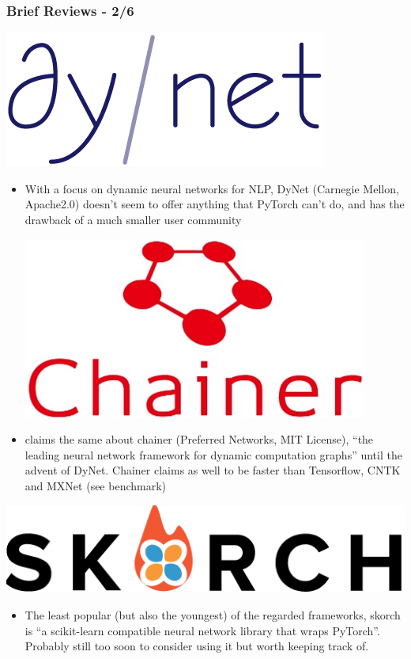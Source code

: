 \documentclass[hyperref={pdfpagelabels=false}]{beamer}
\begin{document}
     \begin{frame}
       \frametitle{Brief Reviews - 2/6}
       \centering
       \includegraphics[scale=0.14]{logo_dynet.png}
       \begin{itemize}[<.->]
       \item \small{With a focus on dynamic neural networks for NLP\cite[p.200]{petuum}, DyNet (Carnegie Mellon, Apache2.0) doesn't seem to offer anything that PyTorch can't do, and has the drawback of a much smaller user community\cite{dl4j-review}}
         
       \centering
       \includegraphics[scale=0.14]{logo_chainer.png}
     \item \small{\cite{dl4j-review} claims the same about chainer (Preferred Networks, MIT License), ``the leading neural network framework for dynamic computation graphs'' until the advent of DyNet}. Chainer claims as well to be faster than Tensorflow, CNTK and MXNet (see benchmark\cite{chainer-benchmarks})
       \end{itemize}

       \centering
       \includegraphics[scale=0.16]{logo_skorch.png}
       \begin{itemize}[<.->]
       \item \small{The least popular (but also the youngest) of the regarded frameworks, skorch is ``a scikit-learn compatible neural network library that wraps PyTorch''\cite{skorch-web}. Probably still too soon to consider using it but worth keeping track of.}
       \end{itemize}
       
     \end{frame}
\end{document}
